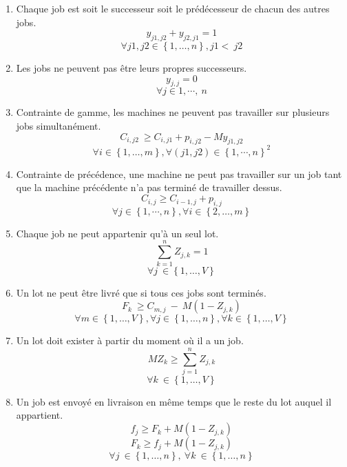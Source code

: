 \documentclass{article}
\begin{document}
        \begin{enumerate}
            \item 
                Chaque job est soit le successeur soit le prédécesseur de chacun des autres jobs.
                $$y_{j1,j2}+y_{j2,j1}=1$$
                $$\forall j1,j2\in\left\{1,\dotsc,n\right\},j1<\ j2$$
        
            \item 
                Les jobs ne peuvent pas être leurs propres successeurs.
                $$y_{j,j}=0$$
                $$\forall j\in{1,\cdots,\ n}$$
            \item
        	    Contrainte de gamme, les machines ne peuvent pas travailler sur plusieurs jobs simultanément.
                $$C_{i,j2}\ \geq C_{i,j1}+p_{i,j2}-My_{j1,j2}$$
                $$\forall i\in\left\{1,\dotsc,m\right\},\forall\left(j1,j2\right)\in\left\{1,\cdots,n\right\}^2$$
            \item
            	Contrainte de précédence, une machine ne peut pas travailler sur un job tant que la machine précédente n’a pas terminé de travailler dessus.
                $$C_{i,j}\geq C_{i-1,j}+p_{i,j}$$
                $$\forall j\in\left\{1,\cdots,n\right\},\forall i\in\left\{2,\dotsc,m\right\}$$
            \item
            	Chaque job ne peut appartenir qu’à un seul lot.
                $$\sum_{k=1}^{n}Z_{j,k}=1$$
                $$\forall j\ \in\left\{1,\dotsc,V\right\}$$
            \item
            	Un lot ne peut être livré que si tous ces jobs sont terminés.
                $$F_k\ \geq C_{m,j}\ -\ M\left(1-Z_{j,k}\right)$$
                $$\forall m\in\left\{1,\dotsc,V\right\},\forall j\in\left\{1,\dotsc,n\right\},\forall k\in\left\{1,\dotsc,V\right\}$$
            \item
            	Un lot doit exister à partir du moment où il a un job.
                $$MZ_k\geq\sum_{j=1}^{n}Z_{j,k}$$
                $$\forall k\ \in\left\{1,\dotsc,V\right\}$$
            \item
        	Un job est envoyé en livraison en même temps que le reste du lot auquel il appartient.
                $$f_j\geq F_k+M\left(1-Z_{j,k}\right)$$
                $$F_k \geq f_j+M\left(1-Z_{j,k}\right)$$
                $$\forall j\ \in\left\{1,\dotsc,n\right\},\ \forall k\ \in\left\{1,\dotsc,n\right\}$$
            
        \end{enumerate}
    	
    
\end{document}
